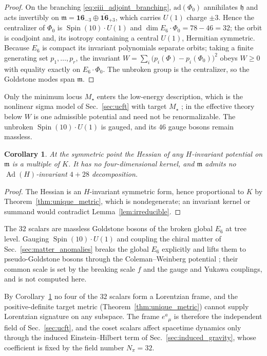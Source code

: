\documentclass[aps,prd,preprint,longbibliography,nofootinbib,superscriptaddress,floatfix]{revtex4-2}
\newtheorem{corollary}[theorem]{Corollary}
\newcommand{\Spin}{\operatorname{Spin}}
\newcommand{\Ad}{\operatorname{Ad}}
\begin{document}
\begin{proof}
On the branching \eqref{eq:eiii_adjoint_branching}, \(\mathrm{ad}(\Phi_0)\)
annihilates \(\mathfrak h\) and acts invertibly on
\(\mathfrak m=\mathbf{16}_{-3}\oplus\overline{\mathbf{16}}_{+3}\), which carries
\(U(1)\) charge \(\pm3\). Hence the centralizer of \(\Phi_0\) is
\(\Spin(10)\cdot U(1)\) and \(\dim E_6\cdot\Phi_0=78-46=32\); the orbit is
coadjoint and, its isotropy containing a central \(U(1)\), Hermitian symmetric.
Because \(E_6\) is compact its invariant polynomials separate orbits; taking a
finite generating set \(p_1,\dots,p_r\), the invariant
\(W=\sum_i\bigl(p_i(\Phi)-p_i(\Phi_0)\bigr)^2\) obeys \(W\ge0\) with equality
exactly on \(E_6\cdot\Phi_0\). The unbroken group is the centralizer, so the
Goldstone modes span \(\mathfrak m\).
\end{proof}

Only the minimum locus \(M_\star\) enters the low-energy description, which is
the nonlinear sigma model of Sec.~\ref{sec:ucft} with target \(M_\star\)
\cite{ColemanWessZumino,CallanColemanWessZumino}; in the effective theory below
\(W\) is one admissible potential and need not be renormalizable. The unbroken
\(\Spin(10)\cdot U(1)\) is gauged, and its \(46\) gauge bosons remain massless.

\begin{corollary}
\label{cor:degenerate_hessian}
At the symmetric point the Hessian of any \(H\)-invariant potential on
\(\mathfrak m\) is a multiple of \(K\). It has no four-dimensional kernel, and
\(\mathfrak m\) admits no \(\Ad(H)\)-invariant \(4+28\) decomposition.
\end{corollary}

\begin{proof}
The Hessian is an \(H\)-invariant symmetric form, hence proportional to \(K\) by
Theorem~\ref{thm:unique_metric}, which is nondegenerate; an invariant kernel or
summand would contradict Lemma~\ref{lem:irreducible}.
\end{proof}

The \(32\) scalars are massless Goldstone bosons of the broken global \(E_6\) at
tree level. Gauging \(\Spin(10)\cdot U(1)\) and coupling the chiral matter of
Sec.~\ref{sec:matter_anomalies} breaks the global \(E_6\) explicitly and lifts
them to pseudo-Goldstone bosons through the Coleman--Weinberg potential
\cite{WeinbergQFT2}; their common scale is set by the breaking scale \(f\) and
the gauge and Yukawa couplings, and is not computed here.

By Corollary~\ref{cor:degenerate_hessian} no four of the \(32\) scalars form a
Lorentzian frame, and the positive-definite target metric
(Theorem~\ref{thm:unique_metric}) cannot supply Lorentzian signature on any
subspace. The frame \(e^a{}_\mu\) is therefore the independent field of
Sec.~\ref{sec:ucft}, and the coset scalars affect spacetime dynamics only
through the induced Einstein--Hilbert term of Sec.~\ref{sec:induced_gravity},
whose coefficient is fixed by the field number \(N_\pi=32\).
\end{document}
